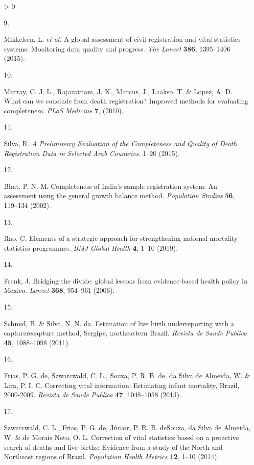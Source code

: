 \documentclass[
]{article}
\newlength{\cslhangindent}
\newlength{\csllabelwidth}
\newenvironment{CSLReferences}[2] %
 {%
  \setlength{\parindent}{0pt}
  \ifodd #1 \everypar{\setlength{\hangindent}{\cslhangindent}}\ignorespaces\fi
  \ifnum #2 > 0
  \setlength{\parskip}{#2\baselineskip}
  \fi
 }%
 {}
\newcommand{\CSLLeftMargin}[1]{\parbox[t]{\csllabelwidth}{#1}}
\newcommand{\CSLRightInline}[1]{\parbox[t]{\linewidth - \csllabelwidth}{#1}\break}
\begin{document}
\begin{CSLReferences}{0}{0}
\leavevmode\hypertarget{ref-Mikkelsen2015}{}%
\CSLLeftMargin{9. }
\CSLRightInline{Mikkelsen, L. \emph{et al.} {A global assessment of civil registration and vital statistics systems: Monitoring data quality and progress}. \emph{The Lancet} \textbf{386}, 1395--1406 (2015).}

\leavevmode\hypertarget{ref-Murray2010}{}%
\CSLLeftMargin{10. }
\CSLRightInline{Murray, C. J. L., Rajaratnam, J. K., Marcus, J., Laakso, T. \& Lopez, A. D. {What can we conclude from death registration? Improved methods for evaluating completeness}. \emph{PLoS Medicine} \textbf{7}, (2010).}

\leavevmode\hypertarget{ref-Silva2015}{}%
\CSLLeftMargin{11. }
\CSLRightInline{Silva, R. \emph{{A Preliminary Evaluation of the Completeness and Quality of Death Registration Data in Selected Arab Countries}}. 1--20 (2015).}

\leavevmode\hypertarget{ref-Bhat2002}{}%
\CSLLeftMargin{12. }
\CSLRightInline{Bhat, P. N. M. {Completeness of India's sample registration system: An assessment using the general growth balance method}. \emph{Population Studies} \textbf{56}, 119--134 (2002).}

\leavevmode\hypertarget{ref-Rao2019}{}%
\CSLLeftMargin{13. }
\CSLRightInline{Rao, C. {Elements of a strategic approach for strengthening national mortality statistics programmes}. \emph{BMJ Global Health} \textbf{4}, 1--10 (2019).}

\leavevmode\hypertarget{ref-Frenk2006}{}%
\CSLLeftMargin{14. }
\CSLRightInline{Frenk, J. {Bridging the divide: global lessons from evidence-based health policy in Mexico}. \emph{Lancet} \textbf{368}, 954--961 (2006).}

\leavevmode\hypertarget{ref-Schmid2011}{}%
\CSLLeftMargin{15. }
\CSLRightInline{Schmid, B. \& Silva, N. N. da. {Estimation of live birth underreporting with a capturerecapture method, Sergipe, northeastern Brazil}. \emph{Revista de Saude Publica} \textbf{45}, 1088--1098 (2011).}

\leavevmode\hypertarget{ref-DeFrias2013}{}%
\CSLLeftMargin{16. }
\CSLRightInline{Frias, P. G. de, Szwarcwald, C. L., Souza, P. R. B. de, da Silva de Almeida, W. \& Lira, P. I. C. {Correcting vital information: Estimating infant mortality, Brazil, 2000-2009}. \emph{Revista de Saude Publica} \textbf{47}, 1048--1058 (2013).}

\leavevmode\hypertarget{ref-Szwarcwald2014}{}%
\CSLLeftMargin{17. }
\CSLRightInline{Szwarcwald, C. L., Frias, P. G. de, Júnior, P. R. B. deSouza, da Silva de Almeida, W. \& de Morais Neto, O. L. {Correction of vital statistics based on a proactive search of deaths and live births: Evidence from a study of the North and Northeast regions of Brazil}. \emph{Population Health Metrics} \textbf{12}, 1--10 (2014).}


\end{CSLReferences}
\end{document}
